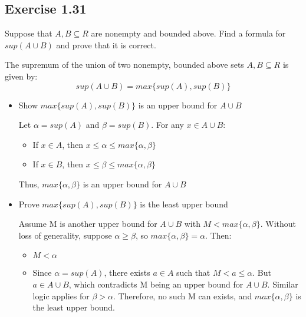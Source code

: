 \documentclass[12pt]{article}
\begin{document}
		\subsection*{Exercise 1.31}
			Suppose that $A,B \subseteq R$ are nonempty and bounded above. Find a formula for $sup(A \cup B)$ and prove that it is correct.
			
			The supremum of the union of two nonempty, bounded above sets $A, B \subseteq R$ is given by:
			\begin{equation}
				sup(A \cup B) = max\{sup(A), sup(B)\}
			\end{equation}
			\begin{itemize}
				\item Show $max\{sup(A), sup(B)\}$ is an upper bound for $A \cup B$
				
				Let $\alpha = sup(A)$ and $\beta = sup(B)$. For any $x \in A \cup B$:
				\begin{itemize}
					\item If $x \in A$, then $x \le \alpha \le max\{\alpha, \beta\}$
					\item If $x \in B$, then $x \le \beta \le max\{\alpha, \beta\}$
				\end{itemize}
				Thus, $max\{\alpha, \beta\}$ is an upper bound for $A \cup B$
				\item Prove $max\{sup(A), sup(B)\}$ is the least upper bound
				
				Assume M is another upper bound for $A \cup B$ with $M < max\{\alpha, \beta\}$. Without loss of generality, suppose $\alpha \ge \beta$, so $max\{\alpha, \beta\} = \alpha$. Then:
				\begin{itemize}
					\item $M < \alpha$
					\item Since $\alpha = sup(A)$, there exists $a \in A$ such that $M < a \le \alpha$. But $a \in A \cup B$, which contradicts M being an upper bound for $A \cup B$. Similar logic applies for $\beta > \alpha$. Therefore, no such M can exists, and $max\{\alpha, \beta\}$ is the least upper bound.
				\end{itemize}
			\end{itemize}
\end{document}
